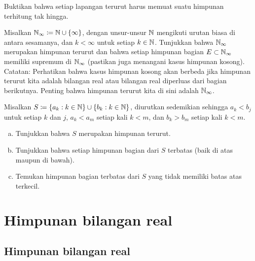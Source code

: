 \begin{exercise}
Buktikan bahwa setiap lapangan terurut harus memuat suatu himpunan terhitung tak hingga.
\end{exercise}

\begin{exercise}
Misalkan ${\mathbb{N}}_{\infty} \coloneqq {\mathbb{N}} \cup \{ \infty \}$, dengan unsur-unsur ${\mathbb{N}}$
mengikuti urutan biasa di antara sesamanya,
dan $k < \infty$ untuk setiap $k \in {\mathbb{N}}$.  Tunjukkan bahwa ${\mathbb{N}}_{\infty}$ merupakan himpunan terurut
dan bahwa setiap himpunan bagian $E \subset {\mathbb{N}}_{\infty}$ memiliki supremum di
${\mathbb{N}}_{\infty}$ (pastikan juga menangani kasus himpunan kosong).
Catatan: Perhatikan bahwa kasus himpunan kosong akan berbeda
jika himpunan terurut kita adalah bilangan real atau bilangan
real diperluas dari bagian berikutnya.  Penting bahwa
himpunan terurut kita di sini adalah ${\mathbb{N}}_{\infty}$.
\end{exercise}

\begin{exercise}
Misalkan $S \coloneqq \{ a_k : k \in {\mathbb{N}} \} \cup \{ b_k : k \in {\mathbb{N}} \}$, diurutkan sedemikian sehingga
$a_k < b_j$ untuk setiap $k$ dan $j$,
$a_k < a_m$ setiap kali $k < m$,
dan $b_k > b_m$ setiap kali $k < m$.
\begin{enumerate}[a)]
\item
Tunjukkan bahwa $S$ merupakan himpunan terurut.
\item
Tunjukkan bahwa setiap himpunan bagian dari $S$ terbatas (baik di atas maupun di bawah).
\item
Temukan himpunan bagian terbatas dari $S$ yang tidak memiliki batas atas terkecil.
\end{enumerate}
\end{exercise}


\sectionnewpage
\section{Himpunan bilangan real} \label{sec:setofreals}



\subsection{Himpunan bilangan real}

